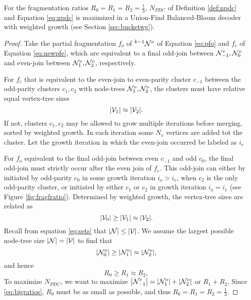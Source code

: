 \begin{theorem}\label{the:fragratio}
  For the fragmentation ratios $R_0 = R_1 = R_2 = \frac{1}{3}$, $N_{PDC}$ of Definition \ref{def:npdc} and Equation \eqref{eq:npdc} is maximized in a Union-Find Balanced-Bloom decoder with weighted growth (see Section \ref{sec:bucketwg}). 
\end{theorem}
\begin{proof}
  Take the partial fragmentation $f_o$ of ${}^{k-1}\mathcal{N}^o$ of Equation \eqref{eq:pfo} and $f_e$ of Equation \eqref{eq:newpfe}, which are equivalent to a final odd-join between $\mathcal{N}^e_{-1}, \mathcal{N}^o_0$ and even-join between $\mathcal{N}^o_1, \mathcal{N}^o_2$, respectively. 
  
  For $f_e$ that is equivalent to the even-join to even-parity cluster $c_{-1}$ between the odd-parity clusters $c_1, c_2$ with node-trees $\mathcal{N}^o_1, \mathcal{N}^o_2$, the clusters must have relative equal vertex-tree sizes 
  \begin{equation*}
    \abs{\mathcal{V}_1} \approx \abs{\mathcal{V}_2}.
  \end{equation*}
  If not, clusters $c_1, c_2$ may be allowed to grow multiple iterations before merging, sorted by weighted growth. In each iteration some $N_v$ vertices are added tot the cluster. Let the growth iteration in which the even-join occurred be labeled as $i_e$
  
  For $f_o$ equivalent to the final odd-join between even $c_{-1}$ and odd $c_0$, the final odd-join must strictly occur after the even join of $f_e$. This odd-join can either by initiated by odd-parity $c_0$ in some growth iteration $i_o > i_e$, when $c_2$ is the only odd-parity cluster, or initiated by either $c_1$ or $c_2$ in growth iteration $i_o = i_e$ (see Figure \ref{fig:fragfratio}). Determined by weighted growth, the vertex-tree sizes are related as
  \begin{equation*}
    \abs{\mathcal{V}_0} \geq \abs{\mathcal{V}_1} \approx \abs{\mathcal{V}_2}.
  \end{equation*}
  Recall from equation \eqref{eq:sets} that $|\mathcal{N}| \leq |\mathcal{V}|$. We assume the largest possible node-tree size $|\mathcal{N}| = |\mathcal{V}|$ to find that 
  \begin{equation*}
    \abs{\mathcal{N}^o_0} \geq \abs{\mathcal{N}^o_1} \approx \abs{\mathcal{N}^o_2},
  \end{equation*}
  and hence
  \begin{equation*}
    R_0 \geq R_1 \approx R_2,
  \end{equation*}
  To maximize $N_{PDC}$, we want to maximize $\abs{\mathcal{N}^e_{-1}} = \abs{\mathcal{N}^o_1} + \abs{\mathcal{N}^o_2}$ or $R_1 + R_2$. Since \eqref{eq:bigratios}, $R_0$ must be as small as possible, and thus $R_0 = R_1 = R_2 = \frac{1}{3}$. 
\end{proof}

